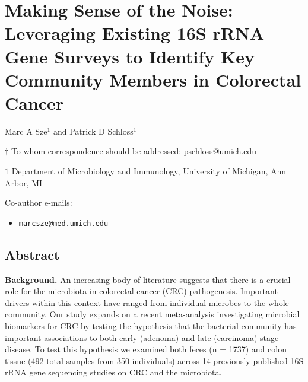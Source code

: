 \documentclass[12pt,]{article}
\title{}
\author{}
\date{}
\providecommand{\tightlist}{%
  \setlength{\itemsep}{0pt}\setlength{\parskip}{0pt}}
\begin{document}
\section{Making Sense of the Noise: Leveraging Existing 16S rRNA Gene
Surveys to Identify Key Community Members in Colorectal
Cancer}\label{making-sense-of-the-noise-leveraging-existing-16s-rrna-gene-surveys-to-identify-key-community-members-in-colorectal-cancer}

\begin{center}
\vspace{25mm}

Marc A Sze${^1}$ and Patrick D Schloss${^1}$${^\dagger}$

\vspace{20mm}

$\dagger$ To whom correspondence should be addressed: pschloss@umich.edu

$1$ Department of Microbiology and Immunology, University of Michigan, Ann Arbor, MI




\end{center}

Co-author e-mails:

\begin{itemize}
\tightlist
\item
  \href{mailto:marcsze@med.umich.edu}{\nolinkurl{marcsze@med.umich.edu}}
\end{itemize}

\newpage

\linenumbers

\subsection{Abstract}\label{abstract}

\textbf{Background.} An increasing body of literature suggests that
there is a crucial role for the microbiota in colorectal cancer (CRC)
pathogenesis. Important drivers within this context have ranged from
individual microbes to the whole community. Our study expands on a
recent meta-analysis investigating microbial biomarkers for CRC by
testing the hypothesis that the bacterial community has important
associations to both early (adenoma) and late (carcinoma) stage disease.
To test this hypothesis we examined both feces (n = 1737) and colon
tissue (492 total samples from 350 individuals) across 14 previously
published 16S rRNA gene sequencing studies on CRC and the microbiota.
\end{document}
